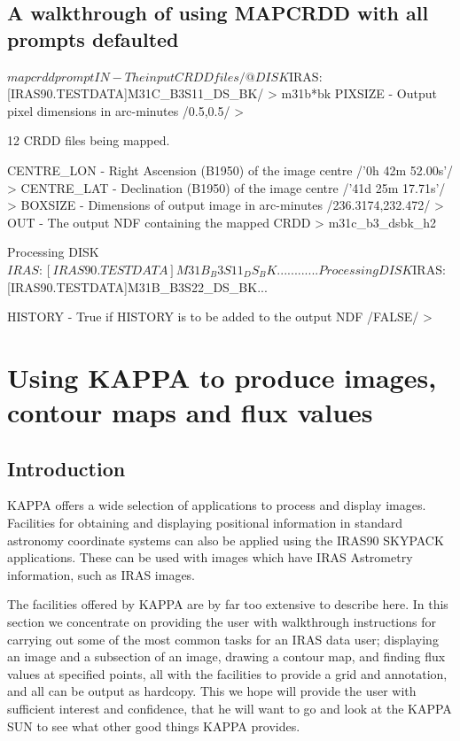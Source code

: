 \documentclass[twoside,11pt]{starlink}
\begin{document}
\subsection{A  walkthrough of using MAPCRDD with all prompts defaulted}
\begin{small}
\begin{terminalv}
$ mapcrdd prompt
IN - The input CRDD files
/@DISK$IRAS:[IRAS90.TESTDATA]M31C_B3S11_DS_BK/ > m31b*bk
PIXSIZE - Output pixel dimensions in arc-minutes /0.5,0.5/ >

  12 CRDD files being mapped.

CENTRE_LON - Right Ascension (B1950) of the image centre /'0h 42m 52.00s'/ >
CENTRE_LAT - Declination (B1950) of the image centre /'41d 25m 17.71s'/ >
BOXSIZE - Dimensions of output image in arc-minutes /236.3174,232.472/ >
OUT - The output NDF containing the mapped CRDD > m31c_b3_dsbk_h2

  Processing
DISK$IRAS:[IRAS90.TESTDATA]M31B_B3S11_DS_BK...
      .               .              .
      .               .              .
      .               .              .
  Processing
DISK$IRAS:[IRAS90.TESTDATA]M31B_B3S22_DS_BK...

HISTORY - True if HISTORY is to be added to the output NDF /FALSE/ >
\end{terminalv}
\end{small}

\section{Using KAPPA to produce images, contour maps and flux values
\label{m:kappa1}}

\subsection{Introduction}
KAPPA offers a wide selection of applications to process  and display images.
Facilities for obtaining and displaying positional information in standard
astronomy coordinate systems can also be applied using the IRAS90 SKYPACK
applications. These can be used with images which have IRAS Astrometry
information, such as IRAS images.

The facilities offered by KAPPA are by far too extensive to describe here.
In this section we concentrate  on providing the user with walkthrough
instructions for carrying out some of the most common tasks for an IRAS data
user; displaying an image and a subsection of an image, drawing a contour map,
and finding flux values at specified points, all with the facilities to provide
a grid and annotation, and all can be output as hardcopy. This we hope will
provide the user  with sufficient interest and confidence, that  he will want
to go and look at the KAPPA SUN to see what other good things KAPPA provides.
\end{document}
